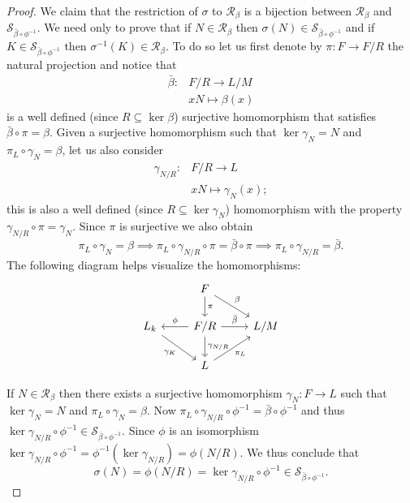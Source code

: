 \begin{proof}
    
    We claim that the restriction of $\sigma$ to $\mathscr{R}_\beta$ is a bijection between $\mathscr{R}_\beta$ and $\mathscr{S}_{\bar{\beta} \circ \phi^{-1}}$. We need only to prove that if $N \in \mathscr{R}_\beta$ then $\sigma{(N)} \in \mathscr{S}_{\bar{\beta} \circ \phi^{-1}}$ and if $K \in \mathscr{S}_{\bar{\beta} \circ \phi^{-1}}$ then $\sigma^{-1}(K) \in \mathscr{R}_\beta$. To do so let us first denote by $\pi \colon F \rightarrow F/R$ the natural projection and notice that
    \begin{align*}
        \bar{\beta} \colon & F/R \rightarrow L/M \\
        & xN \mapsto \beta(x)
    \end{align*}
    is a well defined (since $R \subseteq \ker \beta$) surjective homomorphism that satisfies $\bar{\beta} \circ \pi  = \beta$. Given a surjective homomorphism such that $\ker \gamma_N = N$ and $\pi_L \circ \gamma_N = \beta$, let us also consider
    \begin{align*}
        \gamma_{N/R} \colon & F/R \rightarrow L \\
        & xN \mapsto \gamma_N(x);
    \end{align*}
    this is also a well defined (since $R \subseteq \ker \gamma_N$) homomorphism with the property $\gamma_{N/R} \circ \pi = \gamma_N$. Since $\pi$ is surjective we also obtain
    $$
    \pi_L \circ \gamma_N = \beta \implies \pi_L \circ \gamma_{N/R} \circ \pi = \bar{\beta} \circ \pi \implies \pi_L \circ \gamma_{N/R} = \bar{\beta}.
    $$  
    The following diagram helps visualize the homomorphisms:
    \[\begin{tikzcd}
        & F \\
        {L_k} & {F/R} & {L/M} \\
        & L
        \arrow["{\pi_L}"', from=3-2, to=2-3]
        \arrow["{\bar{\beta}}", from=2-2, to=2-3]
        \arrow["{\gamma_K}"', from=2-1, to=3-2]
        \arrow["\pi", from=1-2, to=2-2]
        \arrow["\beta", from=1-2, to=2-3]
        \arrow["{\gamma_{N/R}}", from=2-2, to=3-2]
        \arrow["\phi"', from=2-2, to=2-1]
    \end{tikzcd}\]

    If $N \in \mathscr{R}_\beta$ then there exists a surjective homomorphism $\gamma_N \colon F \rightarrow L$ such that $\ker \gamma_N = N$ and $\pi_L \circ \gamma_N = \beta$. Now $\pi_L \circ \gamma_{N/R} \circ \phi^{-1} = \bar{\beta} \circ \phi^{-1}$ and thus $\ker {\gamma_{N/R} \circ \phi^{-1}} \in \mathscr{S}_{\bar{\beta} \circ \phi^{-1}}$. Since $\phi$ is an isomorphism $\ker{\gamma_{N/R} \circ \phi^{-1}} = \phi^{-1}(\ker \gamma_{N/R}) = \phi(N/R)$. We thus conclude that 
    $$\sigma(N) = \phi(N/R) = \ker{\gamma_{N/R} \circ \phi^{-1}} \in \mathscr{S}_{\bar{\beta} \circ \phi^{-1}}.$$   



\end{proof}
